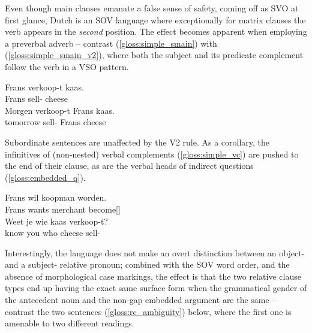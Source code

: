 Even though main clauses emanate a false sense of safety, coming off as SVO at first glance, Dutch is an SOV language where exceptionally for matrix clauses the verb appears in the \textit{second} position.
The effect becomes apparent when employing a preverbal adverb -- contrast (\ref{gloss:simple_smain}) with (\ref{gloss:simple_smain_v2}), where both the subject and its predicate complement follow the verb in a VSO pattern.
\begin{exe}
\ex
\begin{xlist}
\ex\label{gloss:simple_smain}
\gll Frans verkoop-t kaas.\\
Frans sell- cheese\\
\ex\label{gloss:simple_smain_v2}
\gll Morgen verkoop-t Frans kaas.\\
tomorrow sell- Frans cheese\\
\end{xlist}
\end{exe}
Subordinate sentences are unaffected by the V2 rule.
As a corollary, the infinitives of (non-nested) verbal complements (\ref{gloss:simple_vc}) are pushed to the end of their clause, as are the verbal heads of indirect questions (\ref{gloss:embedded_q}).
\begin{exe}
\ex
\begin{xlist}
\ex\label{gloss:simple_vc}
\gll Frans wil koopman worden.\\
Frans wants merchant become[]\\
\ex\label{gloss:embedded_q}
\gll Weet je wie kaas verkoop-t?\\
know you who cheese sell-\\
\end{xlist}
\end{exe}
Interestingly, the language does not make an overt distinction between an object- and a subject- relative pronoun; combined with the SOV word order, and the absence of morphological case markings, the effect is that the two relative clause types end up having the exact same surface form when the grammatical gender of the antecedent noun and the non-gap embedded argument are the same -- contrast the two sentences (\ref{gloss:rc_ambiguity}) below, where the first one is amenable to two different readings.
